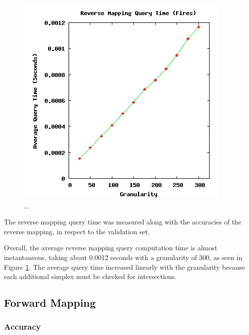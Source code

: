 \begin{figure}[ht]
\centering
\includegraphics[scale=.5]{images/results_fires/rmquery.png}
\caption{...}
\label{fig:rmquery}
\end{figure}

The reverse mapping query time was measured along with the accuracies of the reverse mapping, in respect to the validation set.

Overall, the average reverse mapping query computation time is almost instantaneous, taking about 0.0012 seconds with a granularity of 300, as seen in Figure \ref{fig:rmquery}.
The average query time increased linearly with the granularity because each additional simplex must be checked for intersections.


 \subsection{Forward Mapping}

  \subsubsection{Accuracy}

